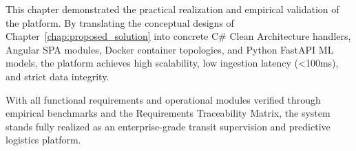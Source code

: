 This chapter demonstrated the practical realization and empirical validation of the  platform. By translating the conceptual designs of Chapter~\ref{chap:proposed_solution} into concrete C\# Clean Architecture handlers, Angular SPA modules, Docker container topologies, and Python FastAPI ML models, the platform achieves high scalability, low ingestion latency (<100ms), and strict data integrity. 

With all functional requirements and operational modules verified through empirical benchmarks and the Requirements Traceability Matrix, the system stands fully realized as an enterprise-grade transit supervision and predictive logistics platform.
